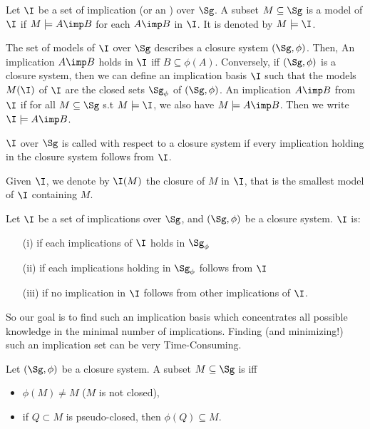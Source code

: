 \documentclass[a4paper]{report}
\begin{document}
\begin{definition} Let $\I$ be
a set of implication (or an ) over $\Sg$. A subset
$M \subseteq \Sg$ is a model of $\I$ if $M \models A \imp
B$ for each $A \imp B$ in $\I$. It is denoted by $M \models \I$.
\end{definition}

The set of models of $\I$ over $\Sg$ describes a closure system $(\Sg, \phi)$. 
Then, An implication $A \imp B$ holds in $\I$ iff $B \subseteq \phi(A)$. 
Conversely, if $(\Sg, \phi)$ is a closure system, then we can define an 
implication basis $\I$ such that the models $M(\I)$ of $\I$ are the closed sets
$\Sg_\phi$ of $(\Sg, \phi)$. An implication $A \imp B$  from $\I$ if for all $M \subseteq \Sg$ s.t $M \models \I$, we also have
$M \models A \imp B$. Then we write $\I \models A \imp B$.

\begin{definition} $\I$ over $\Sg$ is called 
 with respect to a closure system if every implication holding
in the closure system follows from $\I$.
	
\end{definition}

Given $\I$, we denote by $\I(M)$ the closure of $M$ in $\I$, that is the 
smallest model of $\I$ containing $M$.

\begin{definition} Let $\I$ be a set of 
implications over $\Sg$, and $(\Sg, \phi)$ be a closure system. $\I$ is:
\begin{itemize}
	\item[(i)]  if each implications of $\I$ holds in $\Sg_\phi$
	\item[(ii)]  if each implications holding in $\Sg_\phi$ 
	follows from $\I$
	\item[(iii)]  if no implication in $\I$ follows from 
	other implications of $\I$.
\end{itemize}
	
\end{definition}

So our goal is to find such an implication basis which concentrates all possible
knowledge in the minimal number of implications. Finding (and minimizing!) such
an implication set can be very Time-Consuming.

\begin{definition} Let $(\Sg, \phi)$ be a closure 
system. A subset $M \subseteq \Sg$ is  iff 
\begin{itemize}
	\item $\phi(M) \neq M$ ($M$ is not closed),
	\item if $Q \subset M$ is pseudo-closed, then $\phi(Q) \subseteq M$.
\end{itemize}

\end{definition}
\end{document}
